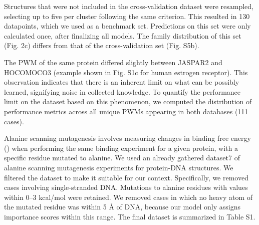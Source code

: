 \par
Structures that were not included in the cross-validation dataset were resampled, selecting up to five per cluster following the same criterion. This resulted in 130 datapoints, which we used as a benchmark set. Predictions on this set were only calculated once, after finalizing all models. The family distribution of this set (Fig. 2c) differs from that of the cross-validation set (Fig. S5b).
\par
The PWM of the same protein differed slightly between JASPAR2 and HOCOMOCO3 (example shown in Fig. S1c for human estrogen receptor). This observation indicates that there is an inherent limit on what can be possibly learned, signifying noise in collected knowledge. To quantify the performance limit on the dataset based on this phenomenon, we computed the distribution of performance metrics across all unique PWMs appearing in both databases (111 cases). 
\par
Alanine scanning mutagenesis involves measuring changes in binding free energy () when performing the same binding experiment for a given protein, with a specific residue mutated to alanine. We used an already gathered dataset7 of alanine scanning mutagenesis experiments for protein-DNA structures. We filtered the dataset to make it suitable for our context. Specifically, we removed cases involving single-stranded DNA. Mutations to alanine residues with  values within 0–3 kcal/mol were retained. We removed cases in which no heavy atom of the mutated residue was within 5 Å of DNA, because our model only assigns importance scores within this range. The final dataset is summarized in Table S1.
